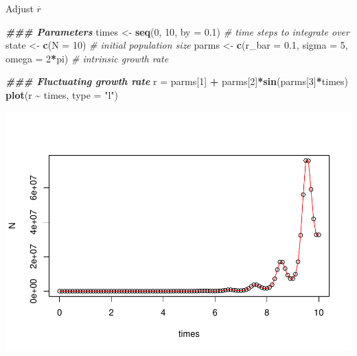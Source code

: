 \documentclass[
]{book}
\newenvironment{Shaded}{\begin{snugshade}}{\end{snugshade}}
\newcommand{\AttributeTok}[1]{\textcolor[rgb]{0.13,0.29,0.53}{#1}}
\newcommand{\CommentTok}[1]{\textcolor[rgb]{0.56,0.35,0.01}{\textit{#1}}}
\newcommand{\DecValTok}[1]{\textcolor[rgb]{0.00,0.00,0.81}{#1}}
\newcommand{\DocumentationTok}[1]{\textcolor[rgb]{0.56,0.35,0.01}{\textbf{\textit{#1}}}}
\newcommand{\FloatTok}[1]{\textcolor[rgb]{0.00,0.00,0.81}{#1}}
\newcommand{\FunctionTok}[1]{\textcolor[rgb]{0.13,0.29,0.53}{\textbf{#1}}}
\newcommand{\NormalTok}[1]{#1}
\newcommand{\OtherTok}[1]{\textcolor[rgb]{0.56,0.35,0.01}{#1}}
\newcommand{\SpecialCharTok}[1]{\textcolor[rgb]{0.81,0.36,0.00}{\textbf{#1}}}
\newcommand{\StringTok}[1]{\textcolor[rgb]{0.31,0.60,0.02}{#1}}
\begin{document}
Adjust \(\overline{r}\)

\begin{Shaded}
\begin{Highlighting}[]
\DocumentationTok{\#\#\# Parameters}
\NormalTok{times }\OtherTok{\textless{}{-}} \FunctionTok{seq}\NormalTok{(}\DecValTok{0}\NormalTok{, }\DecValTok{10}\NormalTok{, }\AttributeTok{by =} \FloatTok{0.1}\NormalTok{)  }\CommentTok{\# time steps to integrate over}
\NormalTok{state }\OtherTok{\textless{}{-}} \FunctionTok{c}\NormalTok{(}\AttributeTok{N =} \DecValTok{10}\NormalTok{)  }\CommentTok{\# initial population size}
\NormalTok{parms }\OtherTok{\textless{}{-}} \FunctionTok{c}\NormalTok{(}\AttributeTok{r\_bar =} \FloatTok{0.1}\NormalTok{, }\AttributeTok{sigma =} \DecValTok{5}\NormalTok{, }\AttributeTok{omega =} \DecValTok{2}\SpecialCharTok{*}\NormalTok{pi)  }\CommentTok{\# intrinsic growth rate}

\DocumentationTok{\#\#\# Fluctuating growth rate}
\NormalTok{r }\OtherTok{=}\NormalTok{ parms[}\DecValTok{1}\NormalTok{] }\SpecialCharTok{+}\NormalTok{ parms[}\DecValTok{2}\NormalTok{]}\SpecialCharTok{*}\FunctionTok{sin}\NormalTok{(parms[}\DecValTok{3}\NormalTok{]}\SpecialCharTok{*}\NormalTok{times)}
\FunctionTok{plot}\NormalTok{(r }\SpecialCharTok{\textasciitilde{}}\NormalTok{ times, }\AttributeTok{type =} \StringTok{"l"}\NormalTok{)}
\end{Highlighting}
\end{Shaded}

\includegraphics{bookdown-demo_files/figure-latex/unnamed-chunk-11-1.pdf}
\end{document}
